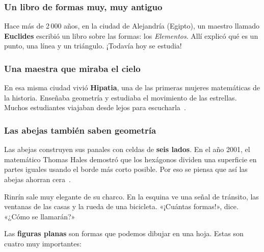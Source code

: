 \documentclass[11pt]{article}
\begin{document}

\subsubsection*{Un libro de formas muy, muy antiguo}
Hace más de 2\,000 años, en la ciudad de Alejandría (Egipto), un maestro
llamado \textbf{Euclides} escribió un libro sobre las formas: los
\emph{Elementos}. Allí explicó qué es un punto, una línea y un triángulo.
¡Todavía hoy se estudia!~\cite{euclides}

\subsubsection*{Una maestra que miraba el cielo}
En esa misma ciudad vivió \textbf{Hipatia}, una de las primeras mujeres
matemáticas de la historia. Enseñaba geometría y estudiaba el movimiento
de las estrellas. Muchos estudiantes viajaban desde lejos para
escucharla~\cite{dzielska}.

\subsubsection*{Las abejas también saben geometría}
Las abejas construyen sus panales con celdas de \textbf{seis lados}. En
el año 2001, el matemático Thomas Hales demostró que los hexágonos dividen una
superficie en partes iguales usando el borde más corto posible. Por eso se piensa
que así las abejas ahorran cera~\cite{hales}.

\label{tema:figuras}

\begin{hilo}
Rinrín sale muy elegante de su charco. En la esquina ve una señal de
tránsito, las ventanas de las casas y la rueda de una bicicleta.
«¡Cuántas formas!», dice. «¿Cómo se llamarán?»
\end{hilo}

Las \textbf{figuras planas} son formas que podemos dibujar en una hoja.
Estas son cuatro muy importantes:

\begin{center}
\end{center}
\end{document}

